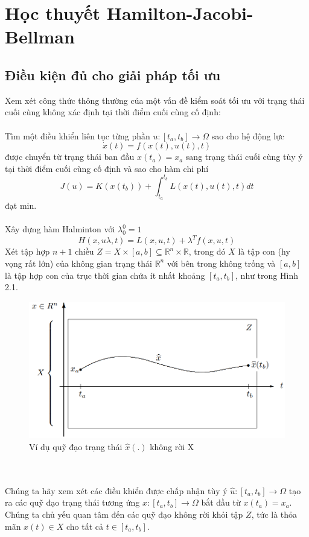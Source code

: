 \documentclass[12pt,a4paper]{report}
\begin{document}
	\section{Học thuyết Hamilton-Jacobi-Bellman}
	\subsection{Điều kiện đủ cho giải pháp tối ưu}
	Xem xét công thức thông thường của một vấn đề kiểm soát tối ưu với trạng thái cuối cùng không xác định tại thời điểm cuối cùng cố định: \\\\ Tìm một điều khiển liên tục từng phần $u : [t_a, t_b] \to \Omega$ sao cho hệ động lực $$\dot{x}(t) = f(x(t), u(t), t)$$ được chuyển từ trạng thái ban đầu $x(t_a) = x_a$ sang trạng thái cuối cùng tùy ý tại thời điểm cuối cùng cố định và sao cho hàm chi phí $$J(u) = K(x(t_b)) + \int_{t_a}^{t_b}L(x(t), u(t), t)dt$$ đạt min.\\\\
	Xây dựng hàm Halminton với $\lambda_0^0 = 1$ $$H(x, u \lambda, t) = L(x, u, t) + \lambda^Tf(x, u, t)$$
	Xét tập hợp $n + 1$ chiều $Z = X \times [a, b] \subseteq \mathbb{R}^n \times \mathbb{R}$, trong đó $X$ là tập con (hy vọng rất lớn) của không gian trạng thái $\mathbb{R}^n$ với bên trong không trống và $[a, b]$ là tập hợp con của trục thời gian chứa ít nhất khoảng $[t_a, t_b]$, như trong Hình 2.1.
	\begin{figure}[h]
		\centering
	  	\includegraphics[scale=.6]{hinh1ct.png}
		\caption{Ví dụ quỹ đạo trạng thái $\hat{x}(.)$ không rời X}
	\end{figure}\\\\
	Chúng ta hãy xem xét các điều khiển được chấp nhận tùy ý $\hat{u}: [t_a, t_b] \to \Omega$ tạo ra các quỹ đạo trạng thái tương ứng $\hat{x}: [t_a, t_b] \to \Omega$ bắt đầu từ $x(t_a) = x_a$. Chúng ta chủ yếu quan tâm đến các quỹ đạo không rời khỏi tập $Z$, tức là thỏa mãn $x(t) \in X$ cho tất cả $t \in [t_a, t_b]$. \\\\
\end{document}
